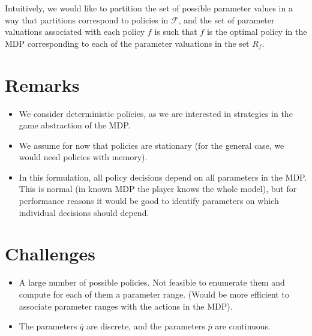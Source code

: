 Intuitively, we would like to partition the set of possible parameter values in a way that partitions correspond to policies in $\mathcal F$, and the set of parameter valuations associated with each policy $f$ is such that $f$ is the optimal policy in the MDP corresponding to each of the parameter valuations in the set $R_f$.

\section*{Remarks}
\begin{itemize}
    \item We consider deterministic policies, as we are interested in strategies in the game abstraction of the MDP.
    \item We assume for now that policies are stationary (for the general case, we would need policies with memory).
    \item In this formulation, all policy decisions depend on all parameters in the MDP. This is normal (in known MDP the player knows the whole model), but for performance reasons it would be good to identify parameters on which individual decisions should depend.
    
\end{itemize}

\section*{Challenges}
\begin{itemize}
    \item A large number of possible policies. Not feasible to enumerate them and compute for each of them a parameter range. (Would be more efficient to associate parameter ranges with the actions in the MDP).
    \item The parameters $\overline q$ are discrete, and the parameters $\overline p$ are continuous.
\end{itemize}


